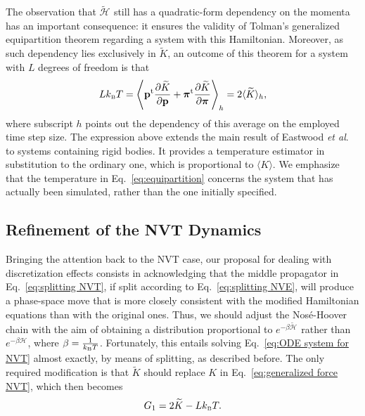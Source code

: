 \documentclass[
	aip,
	jcp,
	reprint,
]{revtex4-1}
\newcommand{\vt}[1]{\boldsymbol{\mathbf{#1}}}          %
\newcommand{\tr}[1]{#1^\text{t}}                       %
\newcommand{\diff}[2]{\frac{\partial #1}{\partial #2}} %
\newcommand{\Ham}[1]{{\mathcal H}_\text{#1}}           %
\newcommand{\timestep}{h}
\newcommand{\refined}[1]{\widetilde{#1}}
\begin{document}
The observation that $\refined{\Ham{}}$ still has a quadratic-form dependency on the momenta has an important consequence: it ensures
the validity of Tolman's generalized equipartition theorem \cite{Tolman_1918, Uline_2008, Eastwood_2010} regarding a system with this Hamiltonian.
Moreover, as such dependency lies exclusively in $\refined K$, an outcome of this theorem for a system with $L$ degrees of freedom is that
\begin{equation}
\label{eq:equipartition}
L k_\text{\tiny B} T = \left\langle \tr{\vt p} \diff{\refined K}{\vt p} + \tr{\vt \pi} \diff{\refined K}{\vt \pi} \right\rangle_\timestep = 2\langle \refined{K} \rangle_\timestep,
\end{equation}
where subscript $\timestep$ points out the dependency of this average on the employed time step size.
The expression above extends the main result of Eastwood \textit{et al}. \cite{Eastwood_2010} to systems containing rigid bodies.
It provides a temperature estimator in substitution to the ordinary one, which is proportional to $\langle K \rangle$.
We emphasize that the temperature in Eq.~\ref{eq:equipartition} concerns the system that has actually been simulated, rather than the one initially specified.

\subsection{Refinement of the NVT Dynamics}
\label{sec:refined_method}

Bringing the attention back to the NVT case, our proposal for dealing with discretization effects consists in acknowledging that the middle propagator in Eq.~\eqref{eq:splitting NVT}, if split according to Eq.~\eqref{eq:splitting NVE}, will produce a phase-space move that is more closely consistent with the modified Hamiltonian equations than with the original ones.
Thus, we should adjust the Nos\'e-Hoover chain with the aim of obtaining a distribution proportional to $e^{-\beta \refined{\Ham{}}}$ rather than $e^{-\beta \Ham{}}$, where $\beta = \frac{1}{k_\text{\tiny B} T}$.
Fortunately, this entails solving Eq.~\eqref{eq:ODE system for NVT} almost exactly, by means of splitting, as described before.
The only required modification is that $\refined K$ should replace $K$ in Eq.~\eqref{eq:generalized force NVT}, which then becomes
\begin{equation}
\label{eq:thermostat_force}
G_1 = 2 \refined K - L k_\text{\tiny B} T.
\end{equation}
\end{document}

